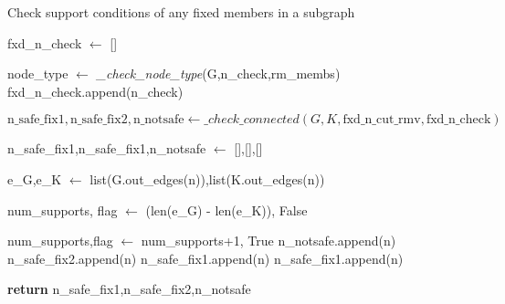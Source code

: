     \begin{algorithm*}[h]
        \scriptsize
        \caption*{Check support conditions of any fixed members in a subgraph}
        \label{alg:check_fixed_nodes_support}
        
        \begin{algorithmic}[1]
            \State fxd\_n\_check $\gets$ []
        
                \State node\_type $\gets$ \textit{\_check\_node\_type}(G,n\_check,rm\_membs)
                    \State fxd\_n\_check.append(n\_check)
                \EndIf
            \EndFor
        
            \State $\text{n\_safe\_fix1}, \text{n\_safe\_fix2}, \text{n\_notsafe} \gets \_check\_connected (G, K, \text{fxd\_n\_cut\_rmv},\text{fxd\_n\_check})$
    
        \EndFunction
        \end{algorithmic}
        \vspace{0.2em}
        \begin{algorithmic}[1]
            \State n\_safe\_fix1,n\_safe\_fix1,n\_notsafe $\gets$ [],[],[]
        
                \State e\_G,e\_K  $\gets$ list(G.out\_edges(n)),list(K.out\_edges(n))
        
                \State num\_supports, flag $\gets$ (len(e\_G) - len(e\_K)), False
        
                            \State num\_supports,flag $\gets$ num\_supports+1, True
                        \EndIf
                    \EndIf
                \EndFor
                    \State n\_notsafe.append(n)
                    \State n\_safe\_fix2.append(n)
                    \State n\_safe\_fix1.append(n)
                    \State n\_safe\_fix1.append(n)
                \EndIf
            \EndFor
        
            \State \textbf{return} n\_safe\_fix1,n\_safe\_fix2,n\_notsafe
        \EndFunction
        \end{algorithmic}
    \end{algorithm*}
    

